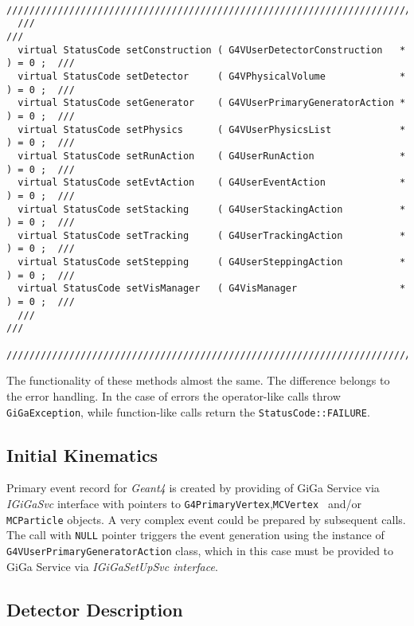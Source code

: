 \documentclass[nfss,times,12pt,a4paper]{article}
\begin{document}
{\begin{tiny}
\begin{verbatim}
  /////////////////////////////////////////////////////////////////////////////////
  ///                                                                           /// 
  virtual StatusCode setConstruction ( G4VUserDetectorConstruction   * ) = 0 ;  /// 
  virtual StatusCode setDetector     ( G4VPhysicalVolume             * ) = 0 ;  /// 
  virtual StatusCode setGenerator    ( G4VUserPrimaryGeneratorAction * ) = 0 ;  /// 
  virtual StatusCode setPhysics      ( G4VUserPhysicsList            * ) = 0 ;  /// 
  virtual StatusCode setRunAction    ( G4UserRunAction               * ) = 0 ;  /// 
  virtual StatusCode setEvtAction    ( G4UserEventAction             * ) = 0 ;  /// 
  virtual StatusCode setStacking     ( G4UserStackingAction          * ) = 0 ;  /// 
  virtual StatusCode setTracking     ( G4UserTrackingAction          * ) = 0 ;  /// 
  virtual StatusCode setStepping     ( G4UserSteppingAction          * ) = 0 ;  /// 
  virtual StatusCode setVisManager   ( G4VisManager                  * ) = 0 ;  /// 
  ///                                                                           /// 
  ////////////////////////////////////////////////////////////////////////////////
\end{verbatim}  
\end{tiny}

The functionality of these methods almost the same.
The difference belongs to the error handling. In the 
case of errors the operator-like calls throw  
{\tt GiGaException}, while function-like calls return
the {\tt StatusCode::FAILURE}.


\subsection  { Initial Kinematics }

Primary event record for {\it Geant4} is created  by 
providing of {\sc GiGa} Service via {\it IGiGaSvc} 
interface  with pointers to 
{\tt G4PrimaryVertex},{\tt MCVertex } and/or {\tt MCParticle}
objects. A very complex event could be prepared by 
subsequent calls. 
The call with {\tt NULL} pointer triggers 
the event generation using the instance 
of {\tt G4VUserPrimaryGeneratorAction} class, 
which in this case must be provided to {\sc GiGa} Service 
via {\it IGiGaSetUpSvc interface}. 

\subsection  { Detector Description } 

}
\end{document}
